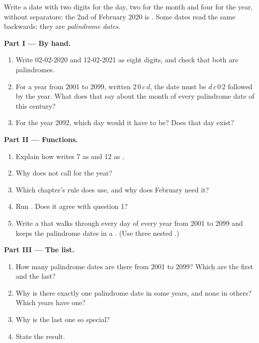 \begin{problem}\label{pb:g7:strings:1}
Write a date with two digits for the day, two for the month and four for the
year, without separators: the 2nd of February 2020 is . Some
dates read the same backwards: they are \emph{palindrome dates}.

\medskip\noindent\textbf{Part I --- By hand.}
\begin{enumerate}
  \item Write 02-02-2020 and 12-02-2021 as eight digits, and check that both
    are palindromes.
  \item For a year from 2001 to 2099, written $2\,0\,c\,d$, the date must be
    $d\,c\,0\,2$ followed by the year. What does that say about the month of
    every palindrome date of this century?
  \item For the year 2092, which day would it have to be? Does that day exist?
\end{enumerate}

\medskip\noindent\textbf{Part II --- Functions.}

\label{lst:g7:strings:dates}

\begin{enumerate}[resume]
  \item Explain how  writes 7 as  and 12 as .
  \item Why does  not call  for the year?
  \item Which chapter's rule does  use, and why does
    February need it?
  \item Run . Does it agree with question 1?
  \item Write a  that walks through every day of every year from 2001
    to 2099 and keeps the palindrome dates in a . (Use three nested
     .)
\end{enumerate}

\medskip\noindent\textbf{Part III --- The list.}
\begin{enumerate}[resume]
  \item How many palindrome dates are there from 2001 to 2099? Which are the
    first and the last?
  \item Why is there exactly one palindrome date in some years, and none in
    others? Which years have one?
  \item Why is the last one so special?
  \item State the result.
\end{enumerate}
\end{problem}
